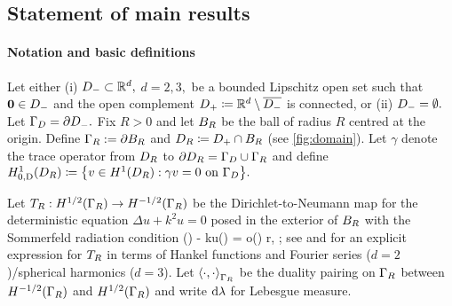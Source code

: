 \subsection{Statement of main results}\label{sec:hh-results}

\paragraph{Notation and basic definitions}Let either (i) $D_{-} \subset \mathbb R^{d},$ $d=2,3,$ be a bounded Lipschitz open set such that $\mathbf{0} \in D_{-}$ and the open complement $D_{+}\coloneqq \mathbb R^d\setminus \overline{D_{-}}$ is connected, or (ii) $D_{-} = \emptyset.$ Let $\Gamma_{D} = \partial D_{-}.$ 
Fix $R>0$ and let $B_{R}$ be the ball of radius $R$ centred at the origin. Define $\Gamma_{R} := \partial B_{R}$ and $D_{R} \coloneqq D_{+} \cap B_{R}$ (see \cref{fig:domain}). Let $\gamma$ denote the trace operator from $D_{R}$ to $\partial D_{R} = \Gamma_{D} \cup \Gamma_{R}$ and define $\HozDDR \de \set{v \in \HoDR \st \gamma v = 0 \ton \GD}.$ 
 
Let $T_{R}: H^{1/2}(\Gamma_R) \rightarrow H^{-1/2}(\Gamma_R)$ be the Dirichlet-to-Neumann map for the deterministic equation $\Delta u+k^2 u=0$ posed in the exterior of $B_{R}$ with the Sommerfeld radiation condition 
\beq\label{eq:src}
(\bx) - \ri ku(\bx) = o\mleft(\mright)  r\de\abs{\bx}\rightarrow \infty,  \frac{\bx}{\abs{\bx}};
\eeq
see \cite[Section 2.6.3]{Ne:01} and \cite[Equations 3.5 and 3.6]{ChMo:08} for an explicit expression for $T_{R}$  in terms of Hankel functions and Fourier series ($d=2$)/spherical harmonics ($d=3$). Let $\IPGR{\cdot}{\cdot}$ be the duality pairing on $\Gamma_{R}$ between $\HmhGR$ and $\HhGR$ and write $\mathrm{d}\lambda$ for Lebesgue measure.

